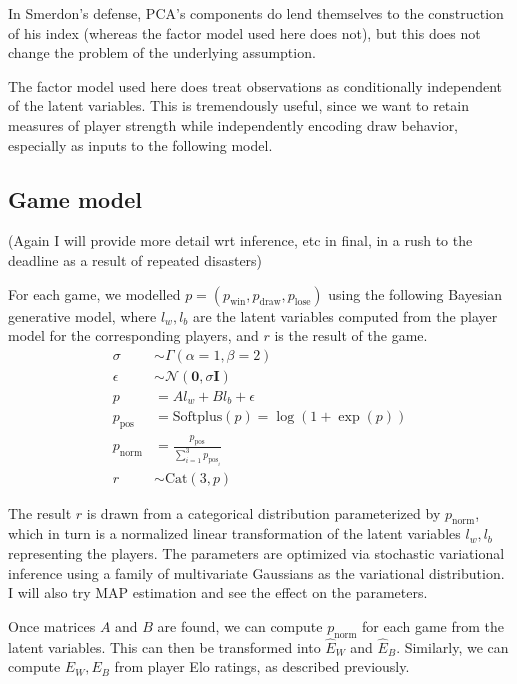 \documentclass{article}
\begin{document}
In Smerdon's defense, PCA's components do lend themselves to the construction of his index (whereas the factor model used here does not), but this does not change the problem of the underlying assumption.

The factor model used here does treat observations as conditionally independent of the latent variables.
This is tremendously useful, since we want to retain measures of player strength while independently encoding
draw behavior, especially as inputs to the following model.

\subsection{Game model}
(Again I will provide more detail wrt inference, etc in final, in a rush to the deadline as a result of repeated disasters)

For each game, we modelled $p=(p_{\text{win}}, p_{\text{draw}}, p_{\text{lose}})$
using the following Bayesian generative model, where $l_w, l_b$ are the latent variables
 computed from the player model for the corresponding players, and $r$ is the result of the game.
\begin{align*}
    \sigma &\sim \Gamma(\alpha=1,\beta=2) \\
    \epsilon  &\sim \mathcal{N}(\mathbf{0}, \sigma\mathbf{I}) \\
    p  &= A l_w + B l_b + \epsilon \\
    p_{\text{pos}}  &= \text{Softplus}(p)= \log(1+\exp(p)) \\
    p_{\text{norm}}  &= \frac{p_{\text{pos}}}{\sum_{i=1}^3 p_{\text{pos}_i}} \\
    r  &\sim \text{Cat}(3, p)
\end{align*}

The result $r$ is drawn from a categorical distribution parameterized by $p_{\text{norm}}$, which in turn is a normalized linear transformation of the latent variables $l_w, l_b$ representing the players.
The parameters are optimized via stochastic variational inference using a family of multivariate Gaussians
as the variational distribution.
I will also try MAP estimation and see the effect on the parameters.

Once matrices $A$ and $B$ are found, we can compute $p_{\text{norm}}$ for each game from the latent variables.
This can then be transformed into $\hat{E}_W$ and $\hat{E}_B$.
Similarly, we can compute $E_W, E_B$ from player Elo ratings, as described previously.
\end{document}
